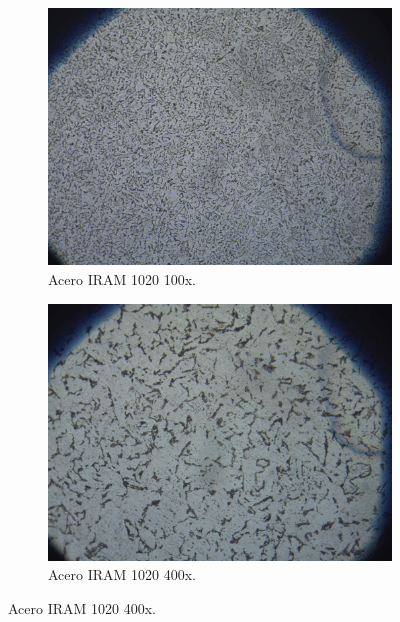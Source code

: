 \documentclass[12pt,a4paper]{article}
\begin{document}
\begin{figure}[h!]
    \centering
    \begin{subfigure}[b]{0.45\linewidth}
        \centering
        \includegraphics[width=\linewidth]{Figuras/Del-Rio_6.png}
        \caption{Acero IRAM 1020 100x.}
        \label{100x}
    \end{subfigure}
    \begin{subfigure}[b]{0.45\linewidth}
        \centering
        \includegraphics[width=\linewidth]{Figuras/Del-Rio_7.png}
        \caption{Acero IRAM 1020 400x.}
        \label{400x}
    \end{subfigure}

    \vspace{1em}


\end{figure}
\end{document}
